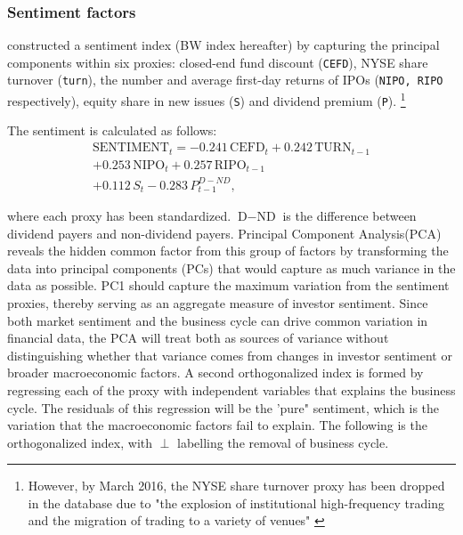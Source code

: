\subsubsection{Sentiment factors}
 constructed a sentiment index (BW index hereafter) by capturing the principal components within six proxies: closed-end fund discount (\texttt{CEFD}), NYSE share turnover (\texttt{turn}), the number and average first-day returns of IPOs (\texttt{NIPO, RIPO} respectively), equity share in new issues (\texttt{S}) and dividend premium (\texttt{P}). \footnote{However, by March 2016, the NYSE share turnover proxy has been dropped in the database due to "the explosion of institutional high-frequency trading and the migration of trading to a variety of venues" \cite{ung_2023}}%

The sentiment is calculated as follows:
\begin{equation}
    \label{eq:sentiment}
    \begin{split}
    \text{SENTIMENT}_t = -0.241\,\text{CEFD}_t + 0.242\,\text{TURN}_{t-1} \\ + 0.253\,\text{NIPO}_t 
    + 0.257\,\text{RIPO}_{t-1} \\ + 0.112\,S_t - 0.283\,P^{D-ND}_{t-1} , 
    \end{split}
\end{equation}

where each proxy has been standardized. $\text{D}-\text{ND}$ is the difference between dividend payers and non-dividend payers. Principal Component Analysis(PCA) reveals the hidden common factor from this group of factors by transforming the data into principal components (PCs) that would capture as much variance in the data as possible. PC1 should capture the maximum variation from the sentiment proxies, thereby serving as an aggregate measure of investor sentiment. Since both market sentiment and the business cycle can drive common variation in financial data, the PCA will treat both as sources of variance without distinguishing whether that variance comes from changes in investor sentiment or broader macroeconomic factors. A second orthogonalized index is formed by regressing each of the proxy with independent variables that explains the business cycle. The residuals of this regression will be the 'pure" sentiment, which is the variation that the macroeconomic factors fail to explain. The following is the orthogonalized index, with $\perp$ labelling the removal of business cycle. 

